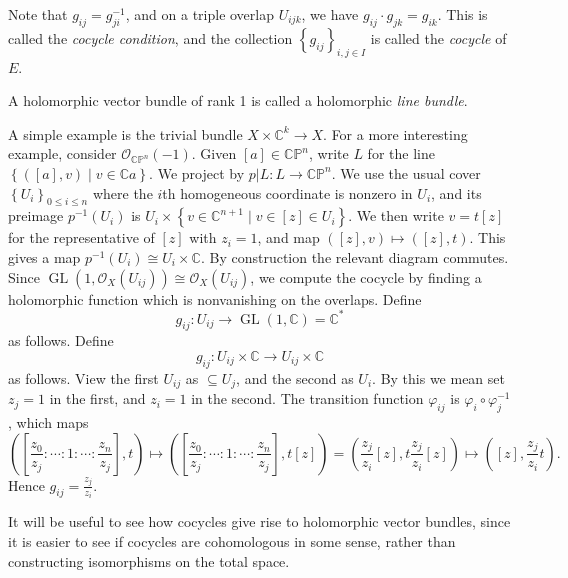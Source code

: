 Note that $g_{ij} =g_{ji} ^{-1} $, and on a triple overlap $U_{ijk} $, we have $g_{ij}\cdot  g_{jk} =g_{ik} $. This is called the \emph{cocycle condition}, and the collection $\left\{ g_{ij}  \right\}_{i,j\in I} $ is called the \emph{cocycle} of $E$.

\begin{terminology}\label{askjnsk}
	A holomorphic vector bundle of rank 1 is called a holomorphic \emph{line bundle}.
\end{terminology}

\begin{example}
	A simple example is the trivial bundle $X\times \mathbb{C} ^k \to X$. For a more interesting example, consider $\mathcal{O}_{\mathbb{C} \mathbb{P} ^n} (-1)$. Given $[a]\in\mathbb{C} \mathbb{P} ^n$, write $L$ for the line $\left\{ ([a],v)\mid v\in\mathbb{C} a \right\} $. We project by $p|L : L \to \mathbb{C} \mathbb{P} ^n$. We use the usual cover $\left\{ U_i \right\}_{0\leq i\leq n} $ where the $i$th homogeneous coordinate is nonzero in $U_i$, and its preimage $p ^{-1} (U_i)$ is $U_i \times \left\{ v\in\mathbb{C} ^{n+1} \mid v\in [z]\in U_i \right\} $. We then write $v = t[z]$ for the representative of $[z]$ with $z_i=1$, and map $([z],v)\mapsto ([z],t)$. This gives a map $p ^{-1} (U_i) \cong U_i \times \mathbb{C} $. By construction the relevant diagram commutes. Since $\operatorname{GL} (1,\mathcal{O} _X(U_{ij} )) \cong \mathcal{O} _{X} (U_{ij} )$, we compute the cocycle by finding a holomorphic function which is nonvanishing on the overlaps. Define
	\[
		g_{ij} : U_{ij}  \to \operatorname{GL} (1,\mathbb{C} )=\mathbb{C} ^*
	\]
	as follows. Define
	\[
		g_{ij} : U_{ij} \times\mathbb{C}  \to U_{ij} \times \mathbb{C} 
	\]
	as follows. View the first $U_{ij} $ as $\subseteq U_j$, and the second as $U_i$. By this we mean set $z_j=1$ in the first, and $z_i=1$ in the second. The transition function $\varphi _{ij} $ is $\varphi _i \circ \varphi _{j} ^{-1} $, which maps
	\[
		\left(\left[ \frac{z_0}{z_j} : \cdots : 1 : \cdots : \frac{z_n}{z_j}  \right],t\right) \mapsto \left( \left[ \frac{z_0}{z_j} : \cdots : 1 : \cdots : \frac{z_n}{z_j}  \right] ,t[z] \right) = \left( \frac{z_j}{z_i}[z], t \frac{z_j}{z_i} [z]  \right) \mapsto \left( [z],\frac{z_j}{z_i} t \right) 
	.\]
	Hence $g_{ij} =\frac{z_j}{z_i} $.
\end{example}

It will be useful to see how cocycles give rise to holomorphic vector bundles, since it is easier to see if cocycles are cohomologous in some sense, rather than constructing isomorphisms on the total space.

